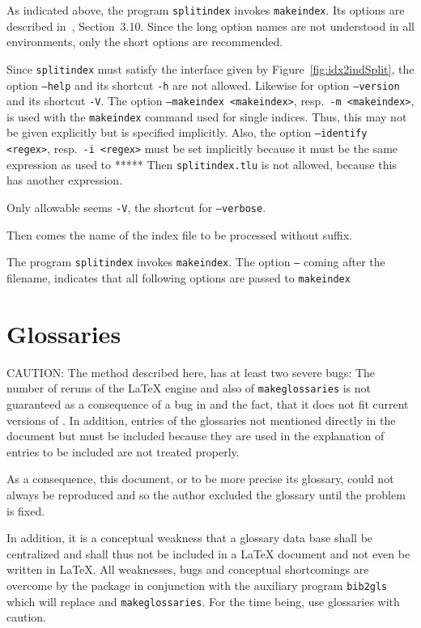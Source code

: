 As indicated above, the program \texttt{splitindex} 
invokes \texttt{makeindex}. 
Its options are described in~\cite{SplitidxP}, Section~3.10. 
Since the long option names are not understood in all environments, 
only the short options are recommended. 

Since \texttt{splitindex} must satisfy the interface 
given by Figure~\ref{fig:idx2indSplit}, 
the option \texttt{--help} and its shortcut \texttt{-h} are not allowed. 
Likewise for option \texttt{--version} and its shortcut \texttt{-V}. 
The option \texttt{--makeindex <makeindex>}, resp.~\texttt{-m <makeindex>}, 
is used with the \texttt{makeindex} command used for single indices. 
Thus, this may not be given explicitly but is specified implicitly. 
Also, the option \texttt{--identify <regex>}, resp.~\texttt{-i <regex>} 
must be set implicitly because it must be the same expression 
as used to ***** 
Then \texttt{splitindex.tlu} is not allowed, 
because this has another expression. 

Only allowable seems \texttt{-V}, the shortcut for \texttt{--verbose}. 

Then comes the name of the index file to be processed 
without suffix. 

The program \texttt{splitindex} invokes \texttt{makeindex}. 
The option \texttt{--} coming after the filename, 
indicates that all following options are passed to \texttt{makeindex} 



\section{Glossaries}\label{sec:glossaries}

CAUTION\@: The method described here, 
has at least two severe bugs: 
The number of reruns of the \LaTeX{} engine and also of \texttt{makeglossaries} 
is not guaranteed as a consequence of a bug in  
and the fact, that it does not fit current versions of . 
In addition, entries of the glossaries not mentioned directly in the document 
but must be included because they are used in the explanation of entries to be included 
are not treated properly. 

As a consequence, this document, or to be more precise its glossary, 
could not always be reproduced and so the author excluded the glossary until the problem is fixed. 

In addition, it is a conceptual weakness that a glossary data base 
shall be centralized and shall thus not be included in a \LaTeX{} document 
and not even be written in \LaTeX. 
All weaknesses, bugs and conceptual shortcomings are overcome 
by the package  in conjunction with the auxiliary program \texttt{bib2gls} 
which will replace  and \texttt{makeglossaries}. 
For the time being, use glossaries with caution. 
\medskip


